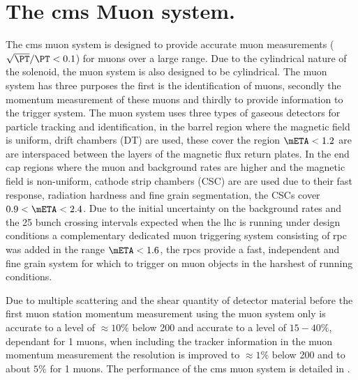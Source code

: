 \section{The \ac{cms} Muon system.} %
\label{sec:the_cms_muon_system}
The \ac{cms} muon system is designed to provide accurate muon \PT measurements 
($\sqrt{\PT}/\PT < 0.1$) for muons over a large \PT range. Due to the 
cylindrical nature of the solenoid, the muon system is also designed to be 
cylindrical. The muon system has three purposes the first is the identification 
of muons, secondly the momentum measurement of these muons and thirdly to 
provide information to the trigger system.
The muon system uses three types of gaseous detectors for particle tracking and 
identification, in the barrel region where the magnetic field is uniform, drift 
chambers (DT) are used, these cover the region $\mETA < 1.2$ are are 
interspaced between the layers of the magnetic flux return plates. In the end 
cap regions where the muon and background rates are higher and the magnetic 
field is non-uniform, cathode strip chambers (CSC) are are used due to their 
fast response, radiation hardness and fine grain segmentation, the CSCs cover 
$0.9 < \mETA < 2.4$. Due to the initial uncertainty on the background rates and 
the \unit{25}{\nano\second} bunch crossing intervals expected when the \ac{lhc} 
is running under design conditions a complementary dedicated muon triggering 
system consisting of \ac{rpc} was added in the range $\mETA < 1.6$, the 
\ac{rpc}s provide a fast, independent and fine grain system for 
which to trigger on muon objects in the harshest of running conditions.

Due to multiple scattering and the shear quantity of detector material before 
the first muon station momentum measurement using the muon system only is 
accurate to a level of $\approx10\%$ below \unit{200}{\GeV} and accurate to a 
level of $15-40\%$, \mETA dependant for \unit{1}{\TeV} muons, when including 
the tracker information in the muon momentum measurement the resolution is 
improved to $\approx1\%$ below \unit{200}{\GeV} and to about $5\%$ for 
\unit{1}{\TeV} muons. The performance of the \ac{cms} muon system is detailed 
in \cite{cmsMuPerf}.

